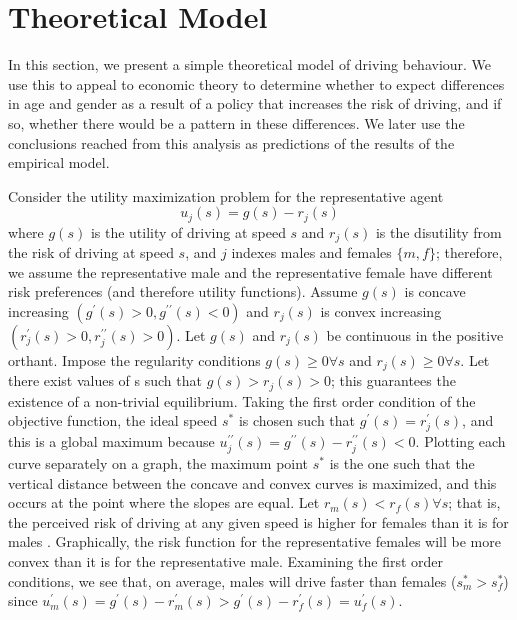 \section{Theoretical Model}
\label{sec:Model}

In this section, we present a simple theoretical model of driving behaviour. 
We use this to appeal to economic theory to determine whether to expect 
differences in age and gender as a result of a policy that increases the risk of driving, 
and if so, whether there would be a pattern in these differences. 
% 
We later use the conclusions reached from this analysis 
as predictions of the results of the empirical model.

Consider the utility maximization problem 
for the representative agent
%
$$
	u_j (s) = g(s) - r_j (s)
$$
% 
where $g(s)$ is the utility of driving at speed $s$ 
and $r_j (s)$ is the disutility from the risk of driving at speed $s$, 
and $j$ indexes males and females $\{m,f\}$;
% 
therefore, we assume the representative male and the representative female 
have different risk preferences (and therefore utility functions). 
% 
Assume $g(s)$ is concave increasing $(g^{\prime} (s)>0, 
g^{\prime\prime} (s)<0)$ 
and $r_j (s)$ is convex increasing $(r_j^{\prime} (s)>0, r_j^{\prime\prime} (s)>0)$. 
Let $g(s)$ and $r_j (s)$ be continuous in the positive orthant. 
Impose the regularity conditions $g(s)\geq0 \forall s$ and $r_j (s)\geq0 \forall s$. 
Let there exist values of s such that $g(s)>r_j (s)>0$; 
this guarantees the existence of a non-trivial equilibrium. 
Taking the first order condition of the objective function, 
the ideal speed $s^*$ is chosen such that $g^{\prime} (s)=r_j^{\prime} (s)$, 
and this is a global maximum because 
$u_j^{\prime\prime} (s)=g^{\prime\prime} (s)-r_j^{\prime\prime} (s)<0$. 
Plotting each curve separately on a graph, 
the maximum point $s^*$ is the one such that 
the vertical distance between the concave and convex curves is maximized, 
and this occurs at the point where the slopes are equal. 
Let $r_m (s)<r_f (s)  \forall s$; 
that is, the perceived risk of driving at any given speed 
is higher for females than it is for males 
\citep{crosongneezy2009}.
Graphically, the risk function for the representative females will be more convex than it is for the representative male. 
Examining the first order conditions, 
we see that, on average, males will drive faster than females ($s_m^*>s_f^*$) 
since 
$u_m^{\prime} (s)
=g^{\prime} (s)-r_m^{\prime} (s)
>g^{\prime} (s)-r_f^{\prime} (s)
=u_f^{\prime} (s)$. \\


